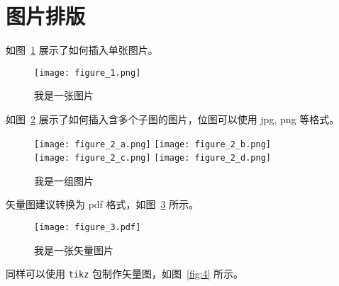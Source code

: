 \section{图片排版}
\label{sec:intro:figure}
如图~\ref{fig:1} 展示了如何插入单张图片。
\begin{figure}[ht] %
    \centering \texttt{[image: figure\_1.png]}
    \caption{我是一张图片} \label{fig:1}
\end{figure}
如图~\ref{fig:2} 展示了如何插入含多个子图的图片，位图可以使用 jpg, png 等格式。
\begin{figure}[ht] \centering
      {\texttt{[image: figure\_2\_a.png]}} \hspace{2em} %
      {\texttt{[image: figure\_2\_b.png]}} \\ \vspace{1em} %
      {\texttt{[image: figure\_2\_c.png]}} \hspace{2em} %
      {\texttt{[image: figure\_2\_d.png]}}
    \caption{我是一组图片} \label{fig:2}
\end{figure}
矢量图建议转换为 pdf 格式，如图~\ref{fig:3} 所示。
\begin{figure}[ht] \centering
    \texttt{[image: figure\_3.pdf]}
    \caption{我是一张矢量图片} \label{fig:3}
\end{figure}
同样可以使用 \verb|tikz| 包制作矢量图，如图~\ref{fig:4} 所示。
